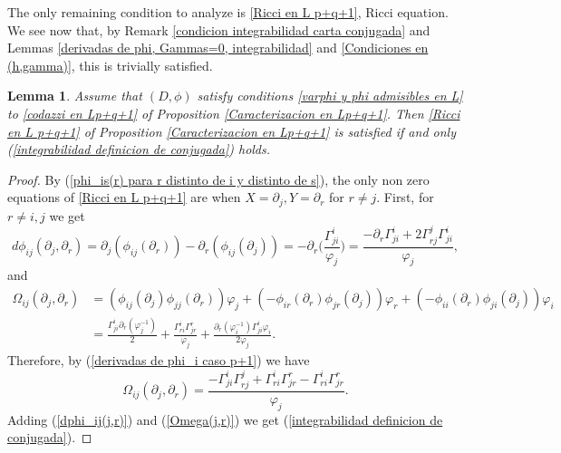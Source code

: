 \documentclass{article}
\newtheorem{lema}[thm]{Lemma}
\theoremstyle{remark}
\begin{document}
The only remaining condition  to analyze is \ref{Ricci en L p+q+1}, Ricci equation. We see now that, by Remark \ref{condicion integrabilidad carta conjugada} and Lemmas \ref{derivadas de phi, Gammas=0, integrabilidad} and \ref{Condiciones en (h,gamma)}, this is trivially satisfied.
\begin{lema}
    Assume that $(D,\phi)$ satisfy conditions \ref{varphi y phi admisibles en L} to \ref{codazzi en Lp+q+1} of Proposition \ref{Caracterizacion en Lp+q+1}. Then \ref{Ricci en L p+q+1} of Proposition \ref{Caracterizacion en Lp+q+1} is satisfied if and only (\ref{integrabilidad definicion de conjugada}) holds.
\end{lema}
\begin{proof}
    By (\ref{phi_is(r) para r distinto de i y distinto de s}), the only non zero equations of \ref{Ricci en L p+q+1} are when $X=\partial_j, Y=\partial_r$ for $r\neq j$. First, for $r\neq i,j$ we get
    \begin{equation}\label{dphi_ij(j,r)}
        d\phi_{ij}(\partial_j,\partial_r)=\partial_j(\phi_{ij}(\partial_r))-\partial_r(\phi_{ij}(\partial_j))=-\partial_r\Big(\frac{\Gamma_{ji}^i}{\varphi_j}\Big)=\frac{-\partial_r\Gamma_{ji}^i+2\Gamma_{rj}^j\Gamma_{ji}^i}{\varphi_j},
    \end{equation}
    and 
    \begin{align*}
        \Omega_{ij}(\partial_j,\partial_r)&=(\phi_{ij}(\partial_j)\phi_{jj}(\partial_r))\varphi_j+(-\phi_{ir}(\partial_r)\phi_{jr}(\partial_j))\varphi_r+(-\phi_{ii}(\partial_r)\phi_{ji}(\partial_j))\varphi_i\\
        &=\frac{\Gamma_{ji}^i\partial_r(\varphi^{-1}_j)}{2}+\frac{\Gamma_{ri}^i\Gamma_{jr}^r}{\varphi_j}+\frac{\partial_r(\varphi^{-1}_i)\Gamma_{ji}^i\varphi_i}{2\varphi_j}.
    \end{align*}
    Therefore, by (\ref{derivadas de phi_i caso p+1}) we have
    \begin{equation}\label{Omega(j,r)}
        \Omega_{ij}(\partial_j,\partial_r)=\frac{-\Gamma_{ji}^i\Gamma_{rj}^j+\Gamma_{ri}^i\Gamma_{jr}^r-\Gamma_{ri}^i\Gamma_{jr}^r}{\varphi_j}.
    \end{equation}
    Adding (\ref{dphi_ij(j,r)}) and (\ref{Omega(j,r)}) we get (\ref{integrabilidad definicion de conjugada}).
    

\end{proof}
\end{document}
